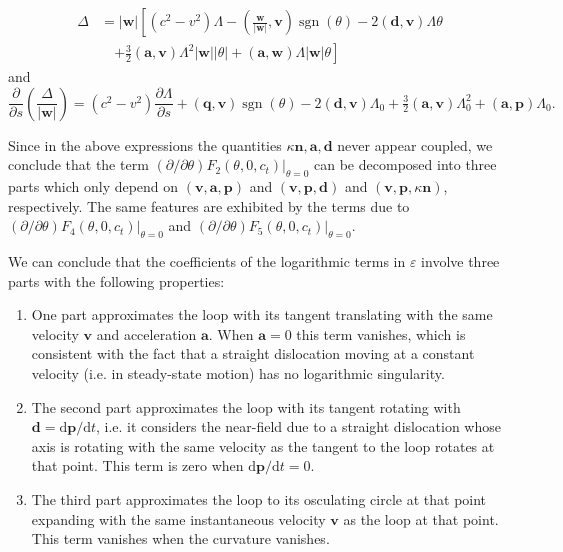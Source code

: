 \documentclass[12pt]{article}
\begin{document}
\begin{align}
\Delta &= |\mathbf{w}|\left[(c^2-v^2)\Lambda - \left(\frac{\mathbf{w}}{|\mathbf{w}|},\mathbf{v}\right)\operatorname{sgn}(\theta) - 2(\mathbf{d},\mathbf{v})\Lambda\theta \right. \nonumber \\
&\quad \left. + \tfrac{3}{2}(\mathbf{a},\mathbf{v})\Lambda^2|\mathbf{w}||\theta| + (\mathbf{a},\mathbf{w})\Lambda|\mathbf{w}|\theta\right]
\end{align}
and
\[
\frac{\partial}{\partial s}\left(\frac{\Delta}{|\mathbf{w}|}\right) = (c^2-v^2)\frac{\partial\Lambda}{\partial s} + (\mathbf{q},\mathbf{v})\operatorname{sgn}(\theta) - 2(\mathbf{d},\mathbf{v})\Lambda_0 + \tfrac{3}{2}(\mathbf{a},\mathbf{v})\Lambda_0^2 + (\mathbf{a},\mathbf{p})\Lambda_0.
\]

Since in the above expressions the quantities $\kappa\mathbf{n}, \mathbf{a}, \mathbf{d}$ never appear coupled, we conclude that the term $(\partial/\partial\theta)F_2(\theta,0,c_t)|_{\theta=0}$ can be decomposed into three parts which only depend on $(\mathbf{v},\mathbf{a},\mathbf{p})$ and $(\mathbf{v},\mathbf{p},\mathbf{d})$ and $(\mathbf{v},\mathbf{p},\kappa\mathbf{n})$, respectively. The same features are exhibited by the terms due to $(\partial/\partial\theta)F_4(\theta,0,c_t)|_{\theta=0}$ and $(\partial/\partial\theta)F_5(\theta,0,c_t)|_{\theta=0}$.

We can conclude that the coefficients of the logarithmic terms in $\varepsilon$ involve three parts with the following properties:

\begin{enumerate}
\item[(a)] One part approximates the loop with its tangent translating with the same velocity $\mathbf{v}$ and acceleration $\mathbf{a}$. When $\mathbf{a}=0$ this term vanishes, which is consistent with the fact that a straight dislocation moving at a constant velocity (i.e. in steady-state motion) has no logarithmic singularity.
\item[(b)] The second part approximates the loop with its tangent rotating with $\mathbf{d}=\mathrm{d}\mathbf{p}/\mathrm{d}t$, i.e. it considers the near-field due to a straight dislocation whose axis is rotating with the same velocity as the tangent to the loop rotates at that point. This term is zero when $\mathrm{d}\mathbf{p}/\mathrm{d}t=0$.
\item[(c)] The third part approximates the loop to its osculating circle at that point expanding with the same instantaneous velocity $\mathbf{v}$ as the loop at that point. This term vanishes when the curvature vanishes.
\end{enumerate}
\end{document}
